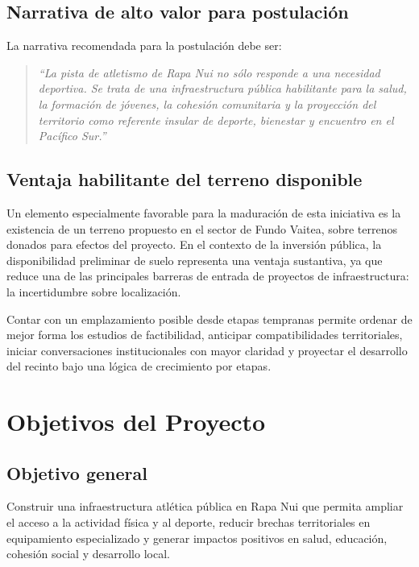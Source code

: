 \documentclass[12pt,letterpaper]{article}
\begin{document}
\subsection{Narrativa de alto valor para postulación}

La narrativa recomendada para la postulación debe ser:

\begin{quote}
\textit{“La pista de atletismo de Rapa Nui no sólo responde a una necesidad deportiva. Se trata de una infraestructura pública habilitante para la salud, la formación de jóvenes, la cohesión comunitaria y la proyección del territorio como referente insular de deporte, bienestar y encuentro en el Pacífico Sur.”}
\end{quote}

\subsection{Ventaja habilitante del terreno disponible}

Un elemento especialmente favorable para la maduración de esta iniciativa es la existencia de un terreno propuesto en el sector de Fundo Vaitea, sobre terrenos donados para efectos del proyecto. En el contexto de la inversión pública, la disponibilidad preliminar de suelo representa una ventaja sustantiva, ya que reduce una de las principales barreras de entrada de proyectos de infraestructura: la incertidumbre sobre localización.

Contar con un emplazamiento posible desde etapas tempranas permite ordenar de mejor forma los estudios de factibilidad, anticipar compatibilidades territoriales, iniciar conversaciones institucionales con mayor claridad y proyectar el desarrollo del recinto bajo una lógica de crecimiento por etapas.

\section{Objetivos del Proyecto}

\subsection{Objetivo general}

Construir una infraestructura atlética pública en Rapa Nui que permita ampliar el acceso a la actividad física y al deporte, reducir brechas territoriales en equipamiento especializado y generar impactos positivos en salud, educación, cohesión social y desarrollo local.
\end{document}
